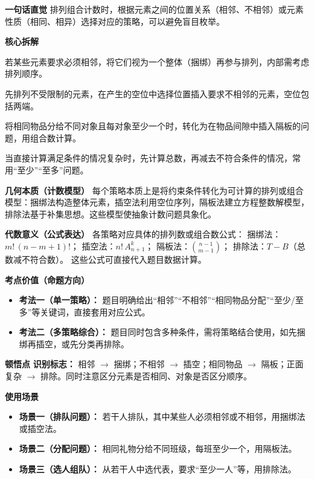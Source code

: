 \begin{explanationbox}
	\textbf{\textcolor{CExplanation}{一句话直觉}}
	排列组合计数时，根据元素之间的位置关系（相邻、不相邻）或元素性质（相同、相异）选择对应的策略，可以避免盲目枚举。

	\medskip
	\textbf{\textcolor{CExplanation}{核心拆解}}
	\begin{description}[style=nextline, leftmargin=2.8em, labelsep=0.5em, itemsep=0.45em]
		\item[\textbf{要点一（相邻捆绑）：}]
			若某些元素要求必须相邻，将它们视为一个整体（捆绑）再参与排列，内部需考虑排列顺序。
		\item[\textbf{要点二（不相邻插空）：}]
			先排列不受限制的元素，在产生的空位中选择位置插入要求不相邻的元素，空位包括两端。
		\item[\textbf{要点三（相同分配隔板）：}]
			将相同物品分给不同对象且每对象至少一个时，转化为在物品间隙中插入隔板的问题，用组合数计算。
		\item[\textbf{要点四（正难则反）：}]
			当直接计算满足条件的情况复杂时，先计算总数，再减去不符合条件的情况，常用“至少”“至多”问题。
	\end{description}

	\medskip
	\textbf{\textcolor{CExplanation}{几何本质（计数模型）}}
	每个策略本质上是将约束条件转化为可计算的排列或组合模型：捆绑法构造整体元素，插空法利用空位序列，隔板法建立方程整数解模型，排除法基于补集思想。这些模型使抽象计数问题具象化。

	\medskip
	\textbf{\textcolor{CExplanation}{代数意义（公式表达）}}
	各策略对应具体的排列数或组合数公式： 捆绑法：$m!\,(n-m+1)!$； 插空法：$n!\,A_{n+1}^{k}$； 隔板法：$\displaystyle\binom{n-1}{m-1}$； 排除法：$T-B$（总数减不符合数）。 这些公式可直接代入题目数据计算。

	\medskip
	\textbf{\textcolor{CExplanation}{考点价值（命题方向）}}
	\begin{itemize}[leftmargin=*, itemsep=0.5em, topsep=0.4em]
		\item \textbf{考法一（单一策略）：} 题目明确给出“相邻”“不相邻”“相同物品分配”“至少/至多”等关键词，直接套用对应公式。
		\item \textbf{考法二（多策略综合）：} 题目同时包含多种条件，需将策略结合使用，如先捆绑再插空，或先分类再排除。
	\end{itemize}

	\medskip
	\textbf{\textcolor{CExplanation}{顿悟点}}
	\textbf{识别标志：} 相邻 $\rightarrow$ 捆绑；不相邻 $\rightarrow$ 插空；相同物品 $\rightarrow$ 隔板；正面复杂 $\rightarrow$ 排除。同时注意区分元素是否相同、对象是否区分顺序。

	\medskip
	\textbf{\textcolor{CExplanation}{使用场景}}
	\begin{itemize}[leftmargin=*, itemsep=0.5em, topsep=0.4em]
		\item \textbf{场景一（排队问题）：} 若干人排队，其中某些人必须相邻或不相邻，用捆绑法或插空法。
		\item \textbf{场景二（分配问题）：} 相同礼物分给不同班级，每班至少一个，用隔板法。
		\item \textbf{场景三（选人组队）：} 从若干人中选代表，要求“至少一人”等，用排除法。
	\end{itemize}

\end{explanationbox}
